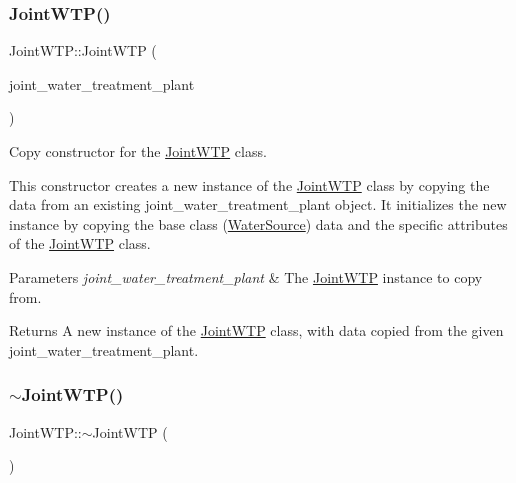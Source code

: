 \subsubsection{\texorpdfstring{Joint\+W\+T\+P()}{JointWTP()}\hspace{0.1cm}{\footnotesize\ttfamily [2/2]}}
{\footnotesize\ttfamily Joint\+W\+T\+P\+::\+Joint\+W\+TP (\begin{DoxyParamCaption}\item[{const \mbox{\hyperlink{classJointWTP}{Joint\+W\+TP}} \&}]{joint\+\_\+water\+\_\+treatment\+\_\+plant }\end{DoxyParamCaption})}



Copy constructor for the \mbox{\hyperlink{classJointWTP}{Joint\+W\+TP}} class. 

This constructor creates a new instance of the \mbox{\hyperlink{classJointWTP}{Joint\+W\+TP}} class by copying the data from an existing {\ttfamily joint\+\_\+water\+\_\+treatment\+\_\+plant} object. It initializes the new instance by copying the base class ({\ttfamily \mbox{\hyperlink{classWaterSource}{Water\+Source}}}) data and the specific attributes of the {\ttfamily \mbox{\hyperlink{classJointWTP}{Joint\+W\+TP}}} class.


\begin{DoxyParams}{Parameters}
{\em joint\+\_\+water\+\_\+treatment\+\_\+plant} & The \mbox{\hyperlink{classJointWTP}{Joint\+W\+TP}} instance to copy from.\\
\hline
\end{DoxyParams}
\begin{DoxyReturn}{Returns}
A new instance of the \mbox{\hyperlink{classJointWTP}{Joint\+W\+TP}} class, with data copied from the given {\ttfamily joint\+\_\+water\+\_\+treatment\+\_\+plant}. 
\end{DoxyReturn}
\mbox{\label{classJointWTP_aa4abdd96213a3c9d1b286f75eadcef1f}} 
\subsubsection{\texorpdfstring{$\sim$\+Joint\+W\+T\+P()}{~JointWTP()}}
{\footnotesize\ttfamily Joint\+W\+T\+P\+::$\sim$\+Joint\+W\+TP (\begin{DoxyParamCaption}{ }\end{DoxyParamCaption})\hspace{0.3cm}{\ttfamily [override]}}



